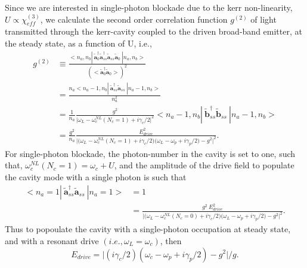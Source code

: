 \documentclass[12pt]{article}
\begin{document}
Since we are interested in single-photon blockade due to the kerr 
non-linearity, $U \propto \chi_{eff}^{(3)}$, we calculate the second order
correlation function $g^{(2)}$ of light transmitted through the kerr-cavity
coupled to the driven broad-band emitter, at the steady state, as a function
of U, i.e.,
\begin{equation}
\begin{split}
g^{(2)} &\equiv 
    \frac{<n_a, n_b | \:
    \tilde{ \mathbf{a} }^{\dagger}_0 \tilde{ \mathbf{a} }^{\dagger}_{ss}
    \tilde{ \mathbf{a} }_{ss} \tilde{ \mathbf{a} }_0 \: |
    n_a, n_b>}
    {(<\tilde{ \mathbf{a} }^{\dagger}_0\tilde{ \mathbf{a} }_0 >)^2}
\\
&= \frac{n_a <n_a - 1, n_b | \:
    \tilde{ \mathbf{a} }^{\dagger}_{ss}\tilde{ \mathbf{a} }_{ss} \: |
    n_a - 1, n_b>}
    {n_a^2}
\\
&= \frac{1}{n_a} 
    \frac{g^2}
    {\big| \omega_L - \omega_c^{NL}(N_c=1) + i\gamma_c/2 \big|^2}
    <n_a - 1, n_b | \:
    \tilde{ \mathbf{b} }^{\dagger}_{ss}\tilde{ \mathbf{b} }_{ss} \: |
    n_a - 1, n_b>
\\
&= \frac{g^2}{n_a}
    \frac{E_{drive}^2}
    {\big| \big( \omega_L - \omega_c^{NL}(N_c=1) + i\gamma_c/2 \big)
    \big( \omega_L - \omega_p + i\gamma_p/2 \big)
    -g^2 \big|^2}.
\end{split}
\end{equation}
For single-photon blockade, the photon-number in the cavity is set to one, such
that, $\omega_c^{NL}( N_c = 1 )  = \omega_c + U$, and the amplitude of the
drive field to populate the cavity mode with a single photon is such that
\begin{equation}
\begin{split}
<n_a = 1 | \:
    \tilde{ \mathbf{a} }^{\dagger}_{ss} \tilde{ \mathbf{a} }_{ss} \: |
    n_a = 1>
    &= 1
\\
&= \frac{g^2 \: E_{drive}^2}
    {\big| \big( \omega_L - \omega_c^{NL}(N_c=0) + i\gamma_c/2 \big)
    \big( \omega_L - \omega_p + i\gamma_p/2 \big)
    -g^2 \big|^2}.
\end{split}
\end{equation}
Thus to popoulate the cavity with a single-photon occupation at steady state,
and with a resonant drive $(i.e., \omega_L = \omega_c)$, then 
\begin{equation}
E_{drive} =
\big| ( i\gamma_c/2 )( \omega_c - \omega_p + i\gamma_p/2 ) -g^2 \big| / g.
\end{equation}
\end{document}
